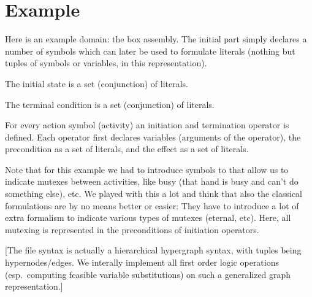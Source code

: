 \documentclass[10pt,fleqn,twoside]{article}
\begin{document}
\section{Example}

Here is an example domain: the box assembly. The initial part simply
declares a number of symbols which can later be used to formulate
literals (nothing but tuples of symbols or variables, in this
representation).

The initial state is a set (conjunction) of literals.

The terminal condition is a set (conjunction) of literals.

For every action symbol (activity) an initiation and termination
operator is defined. Each operator first declares variables (arguments
of the operator), the precondition as a set of literals, and the
effect as a set of literals.

Note that for this example we had to introduce symbols to that allow
us to indicate mutexes between activities, like busy (that hand is
busy and can't do something else), etc. We played with this a lot and
think that also the classical formulations are by no means better or
easier: They have to introduce a lot of extra formalism to indicate
various types of mutexes (eternal, etc). Here, all mutexing is
represented in the preconditions of initiation operators.

[The file syntax is actually a hierarchical hypergraph syntax, with
tuples being hypernodes/edges. We interally implement all first order
logic operations (esp.\ computing feasible variable substitutions) on
such a generalized graph representation.]
\end{document}
